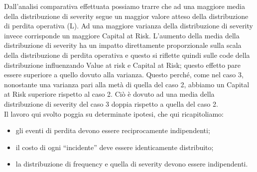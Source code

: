 \documentclass[titlepage]{article}
\begin{document}
\begin{itemize}
{Dall’analisi comparativa effettuata possiamo trarre che ad una maggiore media della distribuzione di severity segue un maggior valore atteso della distribuzione di perdita operativa (L). Ad una maggiore varianza della distribuzione di severity invece corrisponde un maggiore Capital at Risk. L’aumento della media della distribuzione di severity ha un impatto direttamente proporzionale sulla scala della distribuzione di perdita operativa e questo si riflette quindi sulle code della distribuzione influenzando Value at risk e Capital at Risk; questo effetto pare essere superiore a quello dovuto alla varianza. Questo perché, come nel caso 3, nonostante una varianza pari alla metà di quella del caso 2, abbiamo un Capital at Risk superiore rispetto al caso 2. Ciò è dovuto ad una media della distribuzione di severity del caso 3 doppia rispetto a quella del caso 2.
\\
Il lavoro qui svolto poggia su determinate ipotesi, che qui ricapitoliamo:
\begin{itemize}

\item 	gli eventi di perdita devono essere reciprocamente indipendenti;
\item 	il costo di ogni “incidente” deve essere identicamente distribuito;
\item 	la distribuzione di frequency e quella di severity devono essere indipendenti.
	

\end{itemize}}
\end{itemize}
\end{document}
